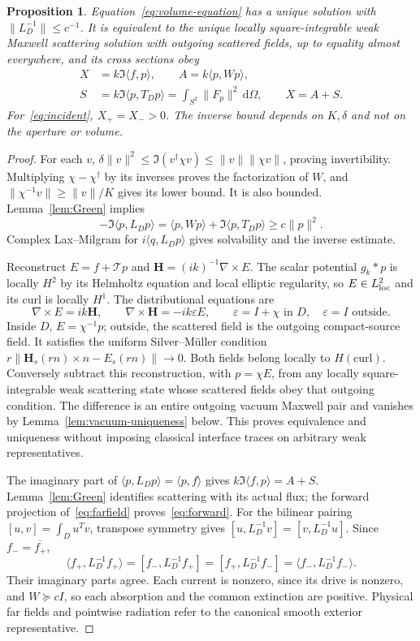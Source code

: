 \documentclass[11pt,a4paper]{article}
\newtheorem{proposition}[theorem]{Proposition}
\theoremstyle{remark}
\newcommand{\norm}[1]{\lVert #1\rVert}
\newcommand{\ip}[2]{\langle #1,#2\rangle}
\newcommand{\dd}{\,\mathrm d}
\begin{document}
\begin{proposition}\label{prop:physical}
Equation~\eqref{eq:volume-equation} has a unique solution with $\norm{L_D^{-1}}\leq c^{-1}$. It is equivalent to the unique locally square-integrable weak Maxwell scattering solution with outgoing scattered fields, up to equality almost everywhere, and its cross sections obey
\begin{equation}\label{eq:work}
 \begin{aligned}
 X&=k\Im\ip fp,\qquad A=k\ip p{Wp},\\
 S&=k\Im\ip p{T_Dp}=\int_{S^2}\norm{F_p}^2\dd\Omega,\qquad X=A+S.
 \end{aligned}
\end{equation}
For~\eqref{eq:incident}, $X_+=X_->0$. The inverse bound depends on $K,\delta$ and not on the aperture or volume.
\end{proposition}
\begin{proof}
For each $v$, $\delta\norm v^2\leq\Im(v^\dagger\chi v)\leq\norm v\norm{\chi v}$, proving invertibility. Multiplying $\chi-\chi^\dagger$ by its inverses proves the factorization of $W$, and $\norm{\chi^{-1}v}\geq\norm v/K$ gives its lower bound. It is also bounded. Lemma~\ref{lem:Green} implies
\[
 -\Im\ip p{L_Dp}=\ip p{Wp}+\Im\ip p{T_Dp}\geq c\norm p^2.
\]
Complex Lax--Milgram for $i\ip q{L_Dp}$ gives solvability and the inverse estimate.

Reconstruct $E=f+\mathcal Tp$ and $\mathbf H=(ik)^{-1}\nabla\times E$. The scalar potential $g_k*p$ is locally $H^2$ by its Helmholtz equation and local elliptic regularity, so $E\in L^2_{\rm loc}$ and its curl is locally $H^1$. The distributional equations are
\[
 \nabla\times E=ik\mathbf H,\qquad \nabla\times\mathbf H=-ik\varepsilon E,
 \qquad\varepsilon=I+\chi\text{ in }D,\quad\varepsilon=I\text{ outside}.
\]
Inside $D$, $E=\chi^{-1}p$; outside, the scattered field is the outgoing compact-source field. It satisfies the uniform Silver--M\"uller condition $r\norm{\mathbf H_s(rn)\times n-E_s(rn)}\to0$. Both fields belong locally to $H(\mathrm{curl})$. Conversely subtract this reconstruction, with $p=\chi E$, from any locally square-integrable weak scattering state whose scattered fields obey that outgoing condition. The difference is an entire outgoing vacuum Maxwell pair and vanishes by Lemma~\ref{lem:vacuum-uniqueness} below. This proves equivalence and uniqueness without imposing classical interface traces on arbitrary weak representatives.

The imaginary part of $\ip p{L_Dp}=\ip pf$ gives $k\Im\ip fp=A+S$. Lemma~\ref{lem:Green} identifies scattering with its actual flux; the forward projection of~\eqref{eq:farfield} proves~\eqref{eq:forward}. For the bilinear pairing $[u,v]=\int_Du^Tv$, transpose symmetry gives $[u,L_D^{-1}v]=[v,L_D^{-1}u]$. Since $f_- =\overline{f_+}$,
\[
 \ip{f_+}{L_D^{-1}f_+}=[f_-,L_D^{-1}f_+]
 =[f_+,L_D^{-1}f_-]=\ip{f_-}{L_D^{-1}f_-}.
\]
Their imaginary parts agree. Each current is nonzero, since its drive is nonzero, and $W\succeq cI$, so each absorption and the common extinction are positive. Physical far fields and pointwise radiation refer to the canonical smooth exterior representative.
\end{proof}
\end{document}
